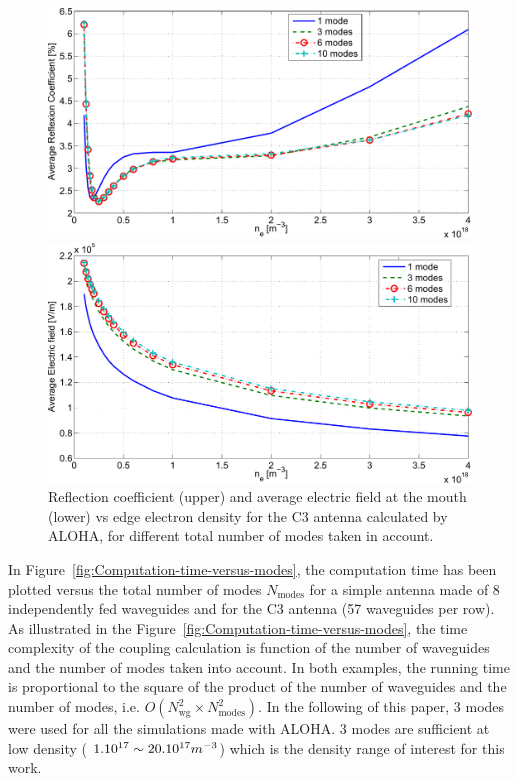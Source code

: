 %
\begin{figure}[h]
	\begin{centering}
		\includegraphics[width=1.0\textwidth]{figures/chap2/ALOHA/figure4a}
		\par\end{centering}
	
	\begin{centering}
		\includegraphics[width=1.0\textwidth]{figures/chap2/ALOHA/figure4b}
		\par\end{centering}
	
	\caption{Reflection coefficient (upper) and average electric
		field at the mouth (lower) vs edge electron density
		for the C3 antenna calculated by ALOHA, for different total number
		of modes taken in account.\label{fig:RC-E_vs_ne_vs_modes} }
	
\end{figure}


In Figure~\ref{fig:Computation-time-versus-modes}, the computation time has been plotted versus the total number of modes $N_{\mbox{modes}}$ for a simple antenna made of 8 independently fed waveguides and for the C3 antenna (57 waveguides per row). As illustrated in the Figure~\ref{fig:Computation-time-versus-modes}, the time complexity of the coupling calculation is function of the number of waveguides and the number of modes taken into account. In both examples, the running time is proportional to the square of the product of the number of waveguides and the number of modes, i.e. $O\left(N_{\mbox{wg}}^{2}\times N_{\mbox{modes}}^{2}\right)$. In the following of this paper, 3 modes were used for all the simulations made with ALOHA. 3 modes are sufficient at low density ( $1.10^{17}\sim20.10^{17}\mbox{\ensuremath{m^{-3}}}$)
which is the density range of interest for this work.


